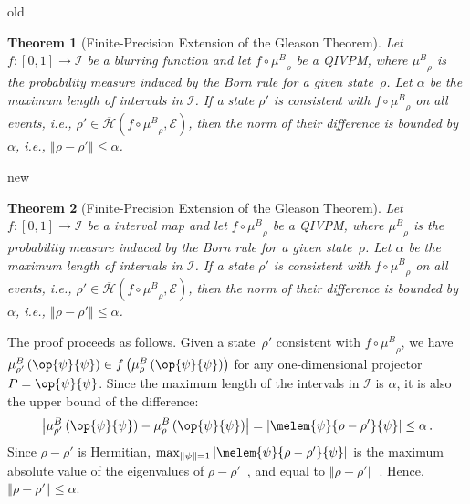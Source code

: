 \documentclass[english,reprint, aps, prl,superscriptaddress, showpacs,
showkeys, longbibliography, amsmath, amssymb, floatfix]{revtex4-1}
\theoremstyle{plain}
\newtheorem{thm}{Theorem}
\theoremstyle{definition}
\newcommand{\Hilb}{\mathcal{H}}
\newcommand{\events}{\ensuremath{\mathcal{E}}}
\newcommand{\proj}[1]{\op{#1}{#1}}
\newcommand{\coreBorn}{\ensuremath{\overline{\Hilb}}}
\newcommand{\muB}{\ensuremath{\mu^{B}}}
\newcommand{\says}[3]{\begin{framed}\begin{minipage}{0.9\linewidth}\color{#1}{#2 says: #3}\end{minipage}\end{framed}}
\newcommand{\andy}[1]{\says{blue}{Andy}{#1}}
\newenvironment{compareNextpage}{\clearpage}{\begin{widetext}\end{widetext}}
\newenvironment{oldText}[1]{\begin{compareText}{#1}{old}}{\end{compareText}\newpage}
\newenvironment{newText}[1]{\begin{compareText}{#1}{new}}{\end{compareText}}
\begin{document}
\begin{compareNextpage}
\begin{oldText}{\andy}
\begin{thm}[Finite-Precision Extension of the Gleason Theorem]\label{thm:Finite-precision-Gleason}Let
$f:\left[0,1\right]\rightarrow\mathscr{I}$ be a {\color{blue}blurring function}
and let $f\circ\muB_{\rho}$ be a QIVPM, where $\muB_{\rho}$ is the
probability measure induced by the Born rule for a given state~$\rho$.
Let $\alpha$ be the maximum length of intervals in $\mathscr{I}$.
If a state $\rho'$ is consistent with $f\circ\muB_{\rho}$ on all
events, i.e., $\rho'\in\coreBorn\left(f\circ\muB_{\rho},\events\right)$,
then the norm of their difference is bounded by $\alpha$, i.e., $\left\Vert \rho-\rho'\right\Vert \le\alpha$.\end{thm}
\end{oldText}
\begin{newText}{\andy}
\begin{thm}[Finite-Precision Extension of the Gleason Theorem]\label{thm:Finite-precision-Gleason}Let
$f:\left[0,1\right]\rightarrow\mathscr{I}$ be a {\color{blue}interval map}
and let $f\circ\muB_{\rho}$ be a QIVPM, where $\muB_{\rho}$ is the
probability measure induced by the Born rule for a given state~$\rho$.
Let $\alpha$ be the maximum length of intervals in $\mathscr{I}$.
If a state $\rho'$ is consistent with $f\circ\muB_{\rho}$ on all
events, i.e., $\rho'\in\coreBorn\left(f\circ\muB_{\rho},\events\right)$,
then the norm of their difference is bounded by $\alpha$, i.e., $\left\Vert \rho-\rho'\right\Vert \le\alpha$.\end{thm}
\end{newText}
\end{compareNextpage}

The proof proceeds as follows. Given a state~$\rho'$ consistent
with $f\circ\muB_{\rho}$, we have $\muB_{\rho'}\left(\proj{\psi}\right)\in f\left(\muB_{\rho}\left(\proj{\psi}\right)\right)$
for any one-dimensional projector $P=\proj{\psi}$. Since the maximum
length of the intervals in $\mathscr{I}$ is $\alpha$, it is also
the upper bound of the difference: 
\[
\left|\muB_{\rho'}\left(\proj{\psi}\right)-\muB_{\rho}\left(\proj{\psi}\right)\right|=\left|\melem{\psi}{\rho-\rho'}{\psi}\right|\le\alpha\,.
\]
Since $\rho-\rho'$ is Hermitian, $\max_{\left\Vert \psi\right\Vert =1}\left|\melem{\psi}{\rho-\rho'}{\psi}\right|$
is the maximum absolute value of the eigenvalues of $\rho-\rho'$~\cite{544199},
and equal to $\left\Vert \rho-\rho'\right\Vert $~\cite{GolubVanLoan1996,Foucart2012}.
Hence, $\left\Vert \rho-\rho'\right\Vert \le\alpha$.
\end{document}
